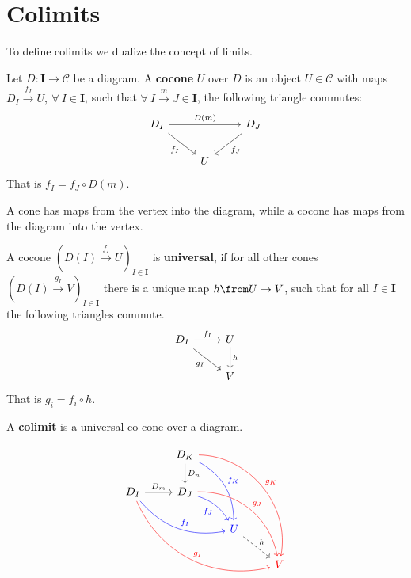 \section{Colimits}
To define colimits we dualize the concept of limits.
\begin{definition}
  Let $D : \bm I \to \mathscr C$ be a diagram.
  A \textbf{cocone} $U$ over $D$ is an object $U \in \mathscr{C}$
  with maps $D_I \overset{ f_I}{\rightarrow} U,\ \forall\ I \in \bm{I}$, such that
  $\forall\ I \overset{m}{\to} J \in \bm{I}$, the following triangle commutes:
  \[
    \begin{tikzcd}
      D_I \arrow[rr, "D(m)"]\arrow[dr, swap, "f_I"] & & D_J \arrow{dl}{f_J}\\
      & U  &
    \end{tikzcd}
  \]
  That is $f_I = f_J \circ D(m)$.
\end{definition}
A cone has maps from the vertex into the diagram,
while a cocone has maps from the diagram into the vertex.
\begin{definition}
  A cocone $(D(I)\overset{f_I}{\to} U)_{I\in \bm{I}}$ is \textbf{universal}, if
  for all other cones $(D(I) \overset{g_I}{\to} V)_{I\in \bm{I}}$ there is a unique
  map $h \from U \to V$, such that for all $I \in \bm{I}$
  the following triangles commute.
  \[
    \begin{tikzcd}
      D_I \arrow[dr, swap, "g_I"] \arrow{r}{f_I} & U \arrow{d}{h} \\
      & V
    \end{tikzcd}
  \]
  That is $g_i = f_i \circ h$.
\end{definition}

\begin{definition}
  A \textbf{colimit} is a universal co-cone over a diagram.
\end{definition}

\[
    \begin{tikzcd}
      & D_K \arrow{d}{D_n}
      \arrow[bend left=30,color=blue]{ddr}{f_K}
      \arrow[bend left=50,color=red]{dddrr}{g_K} & & \\
      D_I \arrow{r}{D_m}
      \arrow[bend right=30,color=blue]{drr}{f_I}
      \arrow[bend right=40,color=red]{ddrrr}{g_I} &
      D_J \arrow[bend left=20,swap, color=blue]{dr}{f_J}
      \arrow[bend left=40,color=red]{ddrr}{g_J} & & \\
      & & {\color{blue}U} \arrow[dashed]{dr}{h}& \\
      & & & {\color{red}V}
    \end{tikzcd}
\]



